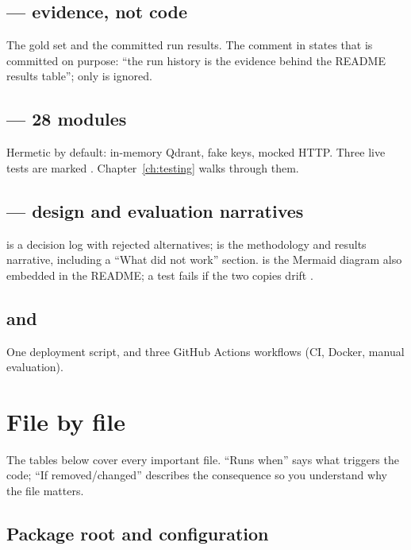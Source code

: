 \subsection{\texorpdfstring{}{eval/} --- evidence, not code}
The gold set and the committed run results. The comment in  states that  is committed on purpose: ``the run history is the evidence behind the README results table''; only  is ignored.

\subsection{\texorpdfstring{}{tests/} --- 28 modules}
Hermetic by default: in-memory Qdrant, fake keys, mocked HTTP. Three live tests are marked . Chapter~\ref{ch:testing} walks through them.

\subsection{\texorpdfstring{}{docs/} --- design and evaluation narratives}
 is a decision log with rejected alternatives;  is the methodology and results narrative, including a ``What did not work'' section.  is the Mermaid diagram also embedded in the README; a test fails if the two copies drift .

\subsection{\texorpdfstring{}{scripts/} and \texorpdfstring{}{.github/}}
One deployment script, and three GitHub Actions workflows (CI, Docker, manual evaluation).

\section{File by file}

The tables below cover every important file. ``Runs when'' says what triggers the code; ``If removed/changed'' describes the consequence so you understand why the file matters.

\subsection{Package root and configuration}

